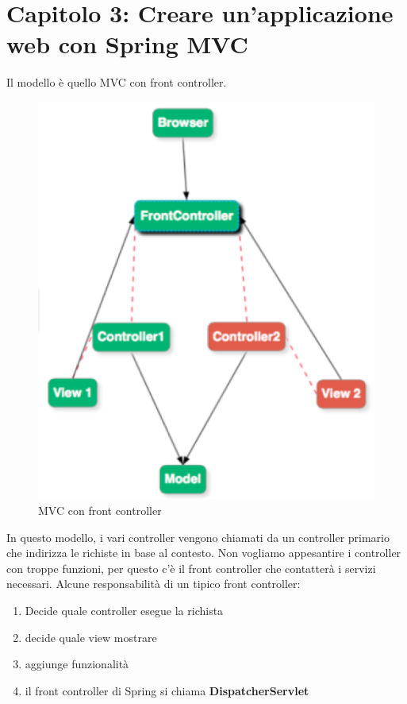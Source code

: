 \documentclass[11pt,a4paper]{book}
\begin{document}
\section{Capitolo 3: Creare un'applicazione web con Spring MVC}
Il modello è quello MVC con front controller.
\begin{figure}[h!]
	\begin{center}
		\includegraphics[scale=0.6]{img/025.png}
		\caption{MVC con front controller}
		\label{fig: 025}
	\end{center}
\end{figure}
In questo modello, i vari controller vengono chiamati da un controller primario che indirizza le richiste in base al contesto. Non vogliamo appesantire i controller con troppe funzioni, per questo c'è il front controller che contatterà i servizi necessari.
Alcune responsabilità di un tipico front controller:
\begin{enumerate}
	\item Decide quale controller esegue la richista
	\item decide quale view mostrare
	\item aggiunge funzionalità
	\item il front controller di Spring si chiama \textbf{DispatcherServlet}
\end{enumerate}
\end{document}
